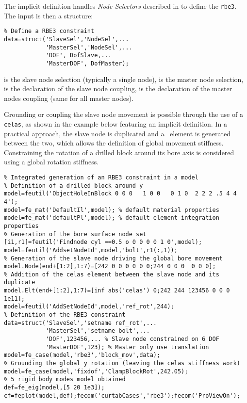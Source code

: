 The implicit definition handles {\it Node Selectors} described in  to define the {\tt rbe3}. The input is then a structure:

\begin{verbatim}
% Define a RBE3 constraint
data=struct('SlaveSel','NodeSel',...
            'MasterSel','NodeSel',...
            'DOF', DofSlave,...
            'MasterDOF', DofMaster);
\end{verbatim}

 is the slave node selection (typically a single node),  is the master node selection,  is the declaration of the slave node coupling,  is the declaration of the master nodes coupling (same for all master nodes).

Grounding or coupling the slave node movement is possible through the use of a {\tt celas}, as shown in the example below featuring an implicit  definition. In a practical approach, the slave node is duplicated and a \celas\ element is generated between the two, which allows the definition of global movement stiffness.  Constraining the rotation of a drilled block around its bore axis is considered using a global rotation stiffness.

\begin{verbatim}
% Integrated generation of an RBE3 constraint in a model
% Definition of a drilled block around y
model=feutil('ObjectHoleInBlock 0 0 0   1 0 0   0 1 0  2 2 2 .5 4 4 4'); 
model=fe_mat('DefaultIl',model); % default material properties
model=fe_mat('defaultPl',model); % default element integration properties
% Generation of the bore surface node set
[i1,r1]=feutil('Findnode cyl ==0.5 o 0 0 0 0 1 0',model);
model=feutil('AddsetNodeId',model,'bolt',r1(:,1));
% Generation of the slave node driving the global bore movement
model.Node(end+[1:2],1:7)=[242 0 0 0 0 0 0;244 0 0 0  0 0 0];
% Addition of the celas element between the slave node and its duplicate
model.Elt(end+[1:2],1:7)=[inf abs('celas') 0;242 244 123456 0 0 0 1e11];
model=feutil('AddSetNodeId',model,'ref_rot',244);
% Definition of the RBE3 constraint
data=struct('SlaveSel','setname ref_rot',...
            'MasterSel','setname bolt',...
            'DOF',123456,... % Slave node constrained on 6 DOF
            'MasterDOF',123); % Master only use translation
model=fe_case(model,'rbe3','block_mov',data);
% Grounding the global y rotation (leaving the celas stiffness work)
model=fe_case(model,'fixdof','ClampBlockRot',242.05);
% 5 rigid body modes model obtained
def=fe_eig(model,[5 20 1e3]);
cf=feplot(model,def);fecom('curtabCases','rbe3');fecom('ProViewOn');
\end{verbatim}%


